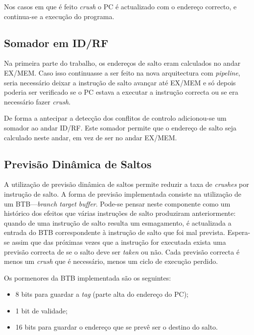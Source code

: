\documentclass[a4paper]{article}
\begin{document}
	Nos casos em que é feito \textit{crush} o PC é actualizado com o endereço correcto, e continua-se a execução do programa.
	
	

	\subsection{Somador em ID/RF}
	
	Na primeira parte do trabalho, os endereços de salto eram calculados no andar EX/MEM. Caso isso continuasse a ser feito na nova arquitectura com \textit{pipeline}, seria necessário deixar a instrução de salto avançar até EX/MEM e só depois poderia ser verificado se o PC estava a executar a instrução correcta ou se era necessário fazer \textit{crush}.
	
	De forma a antecipar a detecção dos conflitos de controlo adicionou-se um somador ao andar ID/RF. Este somador permite que o endereço de salto seja calculado neste andar, em vez de ser no andar EX/MEM.
	
	\subsection{Previsão Dinâmica de Saltos}
	
	A utilização de previsão dinâmica de saltos permite reduzir a taxa de \textit{crushes} por instrução de salto. A forma de previsão implementada consiste na utilização de um BTB---\textit{branch target buffer}. Pode-se pensar neste componente como um histórico dos efeitos que várias instruções de salto produziram anteriormente: quando de uma instrução de salto resulta um esmagamento, é actualizada a entrada do BTB correspondente à instrução de salto que foi mal prevista. Espera-se assim que das próximas vezes que a instrução for executada exista uma previsão correcta de se o salto deve ser \textit{taken} ou não. Cada previsão correcta é menos um \textit{crush} que é necessário, menos um ciclo de execução perdido.
	
	Os pormenores da BTB implementada são os seguintes:
	
	\begin{itemize}
		\item 8 bits para guardar a \textit{tag} (parte alta do endereço do PC);
		\item 1 bit de validade;
		\item 16 bits para guardar o endereço que se prevê ser o destino do salto.
	\end{itemize}
	
\end{document}
